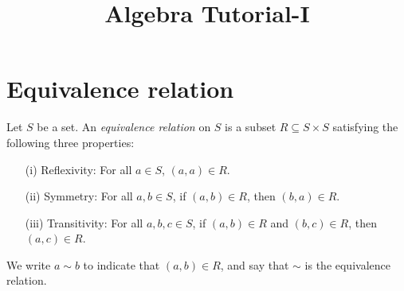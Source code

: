 \documentclass{article}
\title{Algebra Tutorial-I}
\begin{document}
\section*{Equivalence relation}
Let \( S \) be a set. An \emph{equivalence relation} on \( S \) is a subset \( R \subseteq S \times S \) satisfying the following three properties:

\begin{itemize}
  \item[(i)] {Reflexivity:} For all \( a \in S \), \( (a, a) \in R \).
  \item[(ii)] {Symmetry:} For all \( a, b \in S \), if \( (a, b) \in R \), then \( (b, a) \in R \).
  \item[(iii)] {Transitivity:} For all \( a, b, c \in S \), if \( (a, b) \in R \) and \( (b, c) \in R \), then \( (a, c) \in R \).
\end{itemize}

We write \( a \sim b \) to indicate that \( (a, b) \in R \), and say that \( \sim \) is the equivalence relation.
\end{document}
